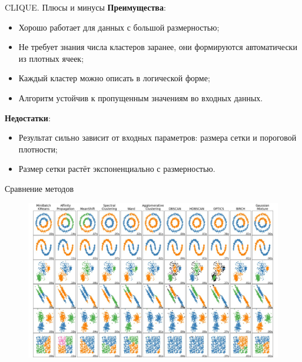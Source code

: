 \documentclass[unicode, notheorems, handout]{beamer}
\begin{document}
\begin{frame}{CLIQUE. Плюсы и минусы}
    \textbf{Преимущества}:
\begin{itemize}
    \item Хорошо работает для данных с большой размерностью;
    
    \item Не требует знания числа кластеров заранее, они формируются автоматически из плотных ячеек;
    
    \item Каждый кластер можно описать в логической форме;

    \item  Алгоритм устойчив к пропущенным значениям во входных данных.
    
\end{itemize}
\vspace{1ex}

\textbf{Недостатки}:
\begin{itemize}
    \item Результат сильно зависит от входных параметров: размера сетки и пороговой плотности;
    \item Размер сетки растёт экспоненциально с размерностью.
\end{itemize}
\end{frame}


\begin{frame}{Сравнение методов}
         \begin{figure}[h]
        \centering
        \includegraphics[width=1\textwidth]{clast_comp.jpg} 
    \end{figure}
\end{frame}
\end{document}
